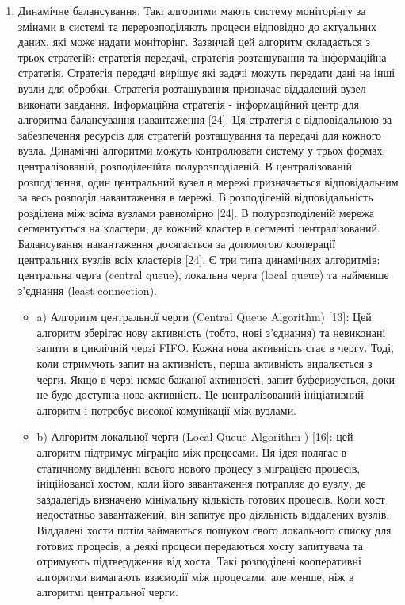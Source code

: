 \documentclass[14pt]{vakthesis}
\begin{document}
\begin{enumerate}
\item Динамічне балансування. Такі алгоритми мають систему моніторінгу за змінами в системі та перерозподіляють процеси відповідно до актуальних даних, які може надати моніторінг. Зазвичай цей алгоритм складається з трьох стратегій: стратегія передачі, стратегія розташування та інформаційна стратегія.
Стратегія передачі вирішує які задачі можуть передати дані на інші вузли для  обробки. Стратегія розташування призначає віддалений вузел виконати завдання.
Інформаційна стратегія - інформаційний центр для алгоритма балансування навантаження [24]. Ця стратегія є відповідальною за забезпечення ресурсів для стратегій розташування та передачі для кожного вузла. Динамічні алгоритми можуть контролювати систему у трьох формах: централізованій, розподіленійта полурозподіленій.
В централізованій розподілення, один центральний вузел в мережі призначається відповідальним за весь розподіл навантаження в мережі. В розподіленій відповідальність розділена між всіма вузлами равномірно [24]. В полурозподіленій мережа сегментується на кластери, де кожний кластер в сегменті централізований.
Балансування навантаження досягається за допомогою кооперації центральних вузлів всіх кластерів [24]. Є три типа динамічних алгоритмів: центральна черга (central queue), локальна черга (local queue) та найменше з'єднання (least connection).

\begin{itemize}

\item a) Алгоритм центральної черги (Central Queue Algorithm) [13]: Цей алгоритм зберігає нову активність (тобто, нові з'єднання) та невиконані запити в циклічній черзі FIFO. Кожна нова активність стає в чергу. Тоді, коли отримують запит на активність, перша активність видаляється з черги. Якщо в черзі немає бажаної активності, запит буферизується, доки не буде доступна нова активність. Це централізований ініціативний алгоритм і потребує високої комунікації між вузлами.

\item b)  Алгоритм локальної черги (Local  Queue  Algorithm ) [16]: цей алгоритм підтримує міграцію між процесами. Ця ідея полягає в статичному виділенні всього нового процесу з міграцією процесів, ініційованої хостом, коли його завантаження потрапляє до вузлу, де заздалегідь визначено мінімальну кількість готових процесів. Коли хост недостатньо завантажений, він запитує про діяльність віддалених вузлів. Віддалені хости потім займаються пошуком свого локального списку для готових процесів, а деякі процеси передаються хосту запитувача та отримують підтвердження від хоста. Такі розподілені кооперативні алгоритми вимагають взаємодії між процесами, але менше, ніж в алгоритмі центральної черги.


\end{itemize}
\end{enumerate}
\end{document}
